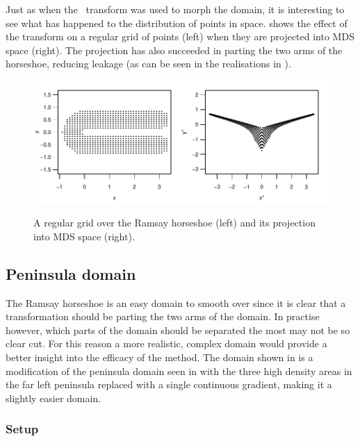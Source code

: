 Just as when the \sch\ transform was used to morph the domain, it is interesting to see what has happened to the distribution of points in space.  shows the effect of the transform on a regular grid of points (left) when they are projected into MDS space (right). The projection has also succeeded in parting the two arms of the horseshoe, reducing leakage (as can be seen in the realisations in ).

\begin{figure}
\centering
\includegraphics[width=6in]{mds/figs/mdsrampoints.pdf} \\
\caption{A regular grid over the Ramsay horseshoe (left) and its projection into MDS space (right).}
\label{mdsrampoints}
\end{figure}


\subsection{Peninsula domain}
\label{mds-wt2-sim}

The Ramsay horseshoe is an easy domain to smooth over since it is clear that a transformation should be parting the two arms of the domain. In practise however, which parts of the domain should be separated the most may not be so clear cut. For this reason a more realistic, complex domain would provide a better insight into the efficacy of the method. The domain shown in  is a modification of the peninsula domain seen in  with the three high density areas in the far left peninsula replaced with a single continuous gradient, making it a slightly easier domain.

\subsubsection{Setup}

